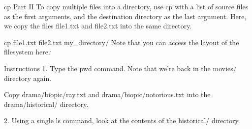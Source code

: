 cp Part II
    To copy multiple files into a directory, use cp with a list of source files as the first arguments, and the destination directory as the last argument. Here, we copy the files file1.txt and file2.txt into the same directory.

    cp file1.txt file2.txt my_directory/ 
    Note that you can access the layout of the filesystem here.`

Instructions
    1.
    Type the pwd command. Note that we’re back in the movies/ directory again.

    Copy drama/biopic/ray.txt and drama/biopic/notorious.txt into the drama/historical/ directory.

    2.
    Using a single ls command, look at the contents of the historical/ directory.